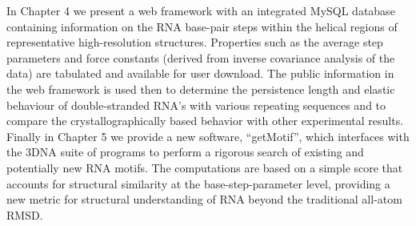 In  Chapter 4  we present  a web  framework with  an  integrated MySQL
database containing information on  the RNA base-pair steps within the
helical      regions       of      representative      high-resolution
structures. Properties  such as the average step  parameters and force
constants (derived  from inverse covariance analysis of  the data) are
tabulated and available for  user download.  The public information in
the web framework is used then to determine the persistence length and
elastic  behaviour  of double-stranded  RNA's  with various  repeating
sequences and to compare  the crystallographically based behavior with
other  experimental results.  Finally in  Chapter 5  we provide  a new
software,  ``getMotif'',  which  interfaces  with the  3DNA  suite  of
programs to perform a rigorous  search of existing and potentially new
RNA  motifs.   The computations  are  based  on  a simple  score  that
accounts for  structural similarity at  the base-step-parameter level,
providing   a   new    metric   \cite{parisien2009}   for   structural
understanding of RNA beyond the traditional all-atom RMSD.



